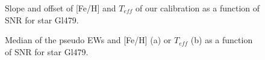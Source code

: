 \documentclass{aa}
\begin{document}
\begin{figure}[htb]
\caption{ Slope and offset of [Fe/H] and $T_{eff}$ of our calibration as a function of SNR for star Gl479.}
\label{fig:fit}
\end{figure}

\begin{figure}[htb]
\centering
{}
\caption{Median of the pseudo EWs and [Fe/H] (a) or $T_{eff}$ (b) as a function of SNR for star Gl479.}
\label{fig:ewsnr}
\end{figure}
\end{document}

